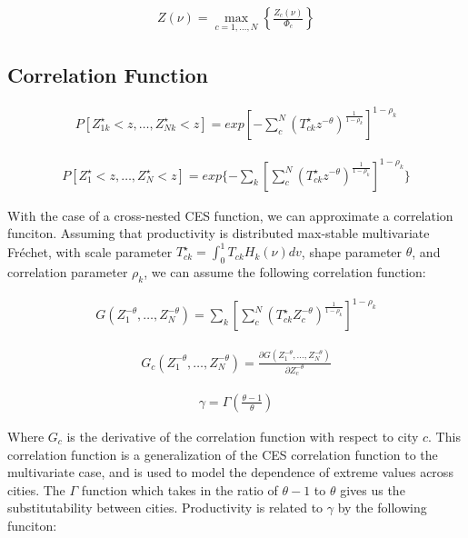 \documentclass[10pt]{article}
\begin{document}
\begin{align}
    Z(\nu) = \max_{c = 1, \dots, N} \left\{\frac{Z_c(\nu)}{\Phi_c}\right\}
\end{align}

\subsection{Correlation Function}

\begin{align}
    P[Z_{1k}^{\star} < z, \dots, Z_{Nk}^{\star} < z] = exp[-\sum_{c}^{N}(T_{ck}^{\star} z^{-\theta})^{\frac{1}{1 - \rho_k}}]^{1 - \rho_k}
\end{align}

\begin{align}
    P[Z_1^{\star} < z, \dots, Z_N^{\star} < z] = exp\{- \sum_{k}^{}[\sum_{c}^{N}(T_{ck}^{\star} z^{-\theta})^{\frac{1}{1 - \rho_k}}]^{1 - \rho_k}\}
\end{align}

With the case of a cross-nested CES function, we can approximate a correlation funciton. Assuming that productivity is distributed max-stable multivariate Fréchet, with scale parameter $T_{ck}^{\star} = \int_{0}^{1} T_{ck} H_k(\nu) dv$, shape parameter $\theta$, and correlation parameter $\rho_k$, we can assume the following correlation function:

\begin{align}
    G (Z_1^{-\theta}, \dots, Z_N^{-\theta})= \sum_{k}^{} [\sum_{c}^{N} (T_{ck}^{\star} Z_c^{-\theta})^{\frac{1}{1 - \rho_k}}]^{1 - \rho_k}
\end{align}

\begin{align}
    G_c (Z_1^{-\theta}, \dots, Z_N^{-\theta}) = \frac{\partial G (Z_1^{-\theta}, \dots, Z_N^{-\theta})}{\partial Z_c^{-\theta}}
\end{align}

\begin{align}
    \gamma = \Gamma (\frac{\theta - 1}{\theta})
\end{align}

Where $G_c$ is the derivative of the correlation function with respect to city $c$. This correlation function is a generalization of the CES correlation function to the multivariate case, and is used to model the dependence of extreme values across cities. The $\Gamma$ function which takes in the ratio of $\theta - 1$ to $\theta$ gives us the substitutability between cities. Productivity is related to $\gamma$ by the following funciton:
\end{document}
